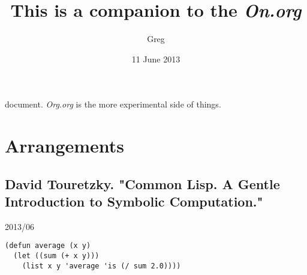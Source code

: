 \documentclass[11pt]{article}
\title{This is a companion to the \emph{On.org}}
\author{Greg}
\date{11 June 2013}
\begin{document}
\maketitle

\setcounter{tocdepth}{3}
\tableofcontents
\vspace*{1cm}
document. \emph{Org.org} is the more experimental
side of things. 

\section{Arrangements}
\label{sec-1}

\subsection{David Touretzky. "Common Lisp. A Gentle Introduction to Symbolic Computation."}
\label{sec-1.1}

2013/06


\begin{verbatim}
(defun average (x y)
  (let ((sum (+ x y)))
    (list x y 'average 'is (/ sum 2.0))))
\end{verbatim}



 
\end{document}
